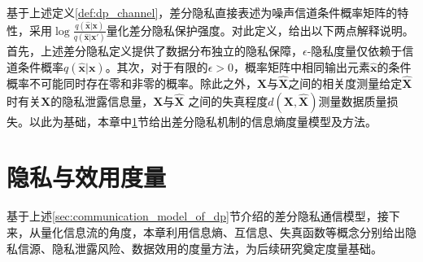 基于上述定义\ref{def:dp_channel}，差分隐私直接表述为噪声信道条件概率矩阵的特性，采用$\log \frac{q(\hat{\bm{x}}|\bm{x})}{q(\hat{\bm{x}}|\bm{x}')}$量化差分隐私保护强度。对此定义，给出以下两点解释说明。首先，上述差分隐私定义提供了数据分布独立的隐私保障，$\epsilon$-隐私度量仅依赖于信道条件概率$q(\hat{\bm{x}}|\bm{x})$。其次，对于有限的$\epsilon > 0$，概率矩阵中相同输出元素$\hat{\bm{x}}$的条件概率不可能同时存在零和非零的概率。除此之外，$\bm{X}$与$\hat{\bm{X}}$之间的相关度测量给定$\hat{\bm{X}}$时有关$\bm{X}$的隐私泄露信息量，$\bm{X}$与$\hat{\bm{X}}$ 之间的失真程度$d(\bm{X},\hat{\bm{X}})$测量数据质量损失。以此为基础，本章中\ref{sec:information_theoretic_metrics}节给出差分隐私机制的信息熵度量模型及方法。



\section{隐私与效用度量}\label{sec:information_theoretic_metrics}
基于上述\ref{sec:communication_model_of_dp}节介绍的差分隐私通信模型，接下来，从量化信息流的角度，本章利用信息熵、互信息、失真函数等概念分别给出隐私信源、隐私泄露风险、数据效用的度量方法，为后续研究奠定度量基础。

